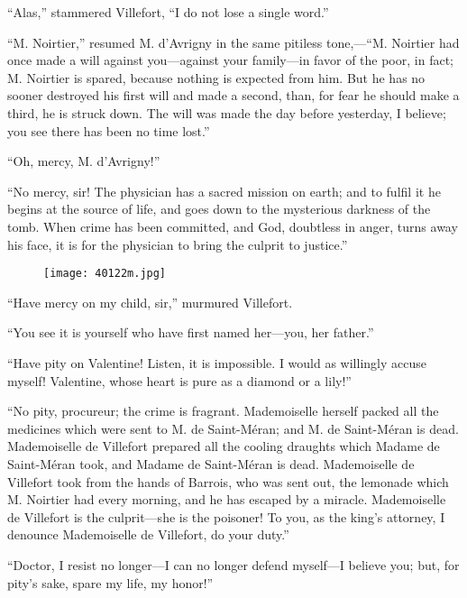 “Alas,” stammered Villefort, “I do not lose a single word.”

“M. Noirtier,” resumed M. d’Avrigny in the same pitiless tone,—“M.
Noirtier had once made a will against you—against your family—in favor
of the poor, in fact; M. Noirtier is spared, because nothing is
expected from him. But he has no sooner destroyed his first will and
made a second, than, for fear he should make a third, he is struck
down. The will was made the day before yesterday, I believe; you see
there has been no time lost.”

“Oh, mercy, M. d’Avrigny!”

“No mercy, sir! The physician has a sacred mission on earth; and to
fulfil it he begins at the source of life, and goes down to the
mysterious darkness of the tomb. When crime has been committed, and
God, doubtless in anger, turns away his face, it is for the physician
to bring the culprit to justice.”

\begin{figure}[ht]
\texttt{[image: 40122m.jpg]}
\end{figure}

“Have mercy on my child, sir,” murmured Villefort.

“You see it is yourself who have first named her—you, her father.”

“Have pity on Valentine! Listen, it is impossible. I would as willingly
accuse myself! Valentine, whose heart is pure as a diamond or a lily!”

“No pity, procureur; the crime is fragrant. Mademoiselle herself packed
all the medicines which were sent to M. de Saint-Méran; and M. de
Saint-Méran is dead. Mademoiselle de Villefort prepared all the cooling
draughts which Madame de Saint-Méran took, and Madame de Saint-Méran is
dead. Mademoiselle de Villefort took from the hands of Barrois, who was
sent out, the lemonade which M. Noirtier had every morning, and he has
escaped by a miracle. Mademoiselle de Villefort is the culprit—she is
the poisoner! To you, as the king’s attorney, I denounce Mademoiselle
de Villefort, do your duty.”

“Doctor, I resist no longer—I can no longer defend myself—I believe
you; but, for pity’s sake, spare my life, my honor!”

